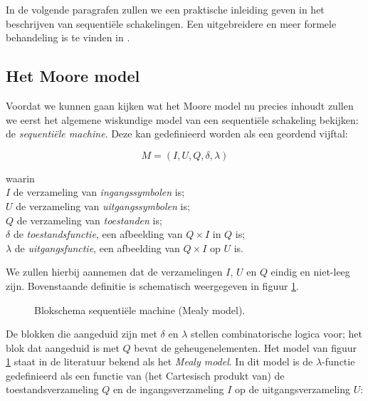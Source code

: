 In de volgende paragrafen zullen we een praktische inleiding geven in het
beschrijven
van sequenti\"ele schakelingen.
Een uitgebreidere en meer formele behandeling
is te vinden in \cite{DT}.

\subsection{Het Moore model}
Voordat we kunnen gaan kijken wat het Moore model nu precies inhoudt zullen
we eerst het algemene wiskundige model van een sequenti\"ele schakeling
bekijken:
de {\em sequenti\"ele machine\/}. Deze kan gedefinieerd worden als een
geordend vijftal:

\begin{equation}
M = (I,U,Q,\delta,\lambda)
\end{equation}

\begin{tabbing}
waarin \= \\
\> $I$ de verzameling van {\em ingangssymbolen\/} is; \\
\> $U$ de verzameling van {\em uitgangssymbolen\/} is; \\
\> $Q$ de verzameling van {\em toestanden\/} is; \\
\> $\delta$ de {\em toestandsfunctie\/}, een afbeelding van $Q \times I$ in $Q$ is; \\
\> $\lambda$ de {\em uitgangsfunctie\/}, een afbeelding van $Q \times I$ op $U$ is.
\end{tabbing}

We zullen hierbij aannemen dat de verzamelingen $I$, $U$ en $Q$
eindig en niet-leeg zijn.
Bovenstaande definitie is schematisch weergegeven in figuur
\ref{figuur:seq_mod}.

\begin{figure}[bth]
\centerline{}
\caption{Blokschema sequenti\"ele machine (Mealy model).}
\label{figuur:seq_mod}
\end{figure}

De blokken die aangeduid zijn met $\delta$ en $\lambda$ stellen combinatorische
logica voor; het blok dat aangeduid is met $Q$ bevat de geheugenelementen.
Het model van figuur \ref{figuur:seq_mod}
staat in de literatuur bekend als het {\em Mealy model\/}.
In dit model is de $\lambda$-functie gedefinieerd als een functie van (het
Cartesisch produkt van) de toestandsverzameling $Q$ en
de ingangsverzameling $I$ op de uitgangsverzameling $U$: 

